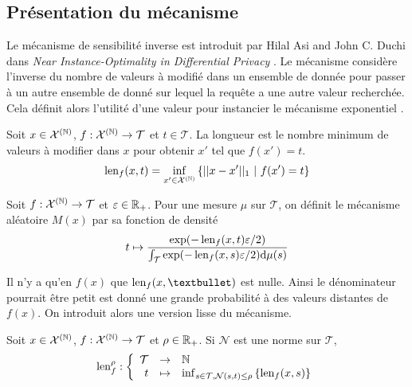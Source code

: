 \subsection{Présentation du mécanisme}

Le mécanisme de sensibilité inverse est introduit par {\sc Hilal Asi} and {\sc John C. Duchi} dans \textit{Near Instance-Optimality in Differential Privacy} \cite{Asi2020NearII}. Le mécanisme considère l'inverse du nombre de valeurs à modifié dans un ensemble de donnée pour passer à un autre ensemble de donné sur lequel la requête a une autre valeur recherchée. Cela définit alors l'utilité d'une valeur pour instancier le mécanisme exponentiel \cite{mcsherry2007mechanism}.\\


Soit \(x \in \mathcal X^{(\mathbb{N})}\), \(f : \mathcal X^{(\mathbb{N})} \to \mathcal T\) et \(t \in \mathcal T\). La longueur est le nombre minimum de valeurs à modifier dans \(x\) pour obtenir \(x'\) tel que \(f(x') = t\). 
\[
    \operatorname{len}_f(x,t) = \inf_{x' \in \mathcal X^{(\mathbb{N})}}\left\{|| x - x'||_1 \ |\ f(x') = t \right\}    
\]


Soit \(f : \mathcal X^{(\mathbb{N})} \to \mathcal T\) et \(\varepsilon \in \mathbb{R}_+\). Pour une mesure \(\mu\) sur \(\mathcal T\), on définit le mécanisme aléatoire \(M(x)\) par sa fonction de densité 
\[
    t \mapsto \dfrac{\exp(-\operatorname{len}_f(x, t)\varepsilon/2)}{\int_\mathcal T \exp(-\operatorname{len}_f(x, s)\varepsilon/2)\mathrm{d} \mu(s)}    
\] 

Il n'y a qu'en \(f(x)\) que \(\len_f(x,•)\) est nulle. Ainsi le dénominateur pourrait être petit est donné une grande probabilité à des valeurs distantes de \(f(x)\). On \cite{mcsherry2007mechanism} introduit alors une version lisse du mécanisme.\\


Soit \(x \in \mathcal X^{(\mathbb{N})}\), \(f : \mathcal X^{(\mathbb{N})} \to \mathcal T\) et \(\rho \in \mathbb{R}_+\). Si \(\mathcal N\) est une norme sur \(\mathcal T\),
\[
    \len_f^{\rho} : 
    \left\{
        \begin{array}[]{rcl}
            \mathcal T & \to & \N\\
            t & \mapsto & \inf_{s \in \mathcal T, \mathcal N(s,t) \leq \rho}\left\{\len_f(x,s) \right\}  
        \end{array}
    \right.    
\]

